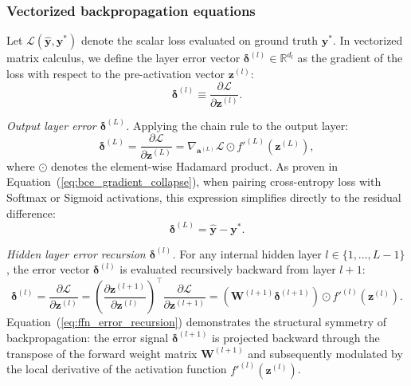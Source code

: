 \documentclass[../../../main.tex]{subfiles}
\begin{document}
\subsubsection{Vectorized backpropagation equations}

Let $\mathcal{L}(\hat{\mathbf{y}}, \mathbf{y}^*)$ denote the scalar loss evaluated on ground truth $\mathbf{y}^*$. In vectorized matrix calculus, we define the layer error vector $\bm{\delta}^{(l)} \in \mathbb{R}^{d_l}$ as the gradient of the loss with respect to the pre-activation vector $\mathbf{z}^{(l)}$:
\begin{equation}
\bm{\delta}^{(l)} \equiv \frac{\partial \mathcal{L}}{\partial \mathbf{z}^{(l)}}.
\end{equation}

\textit{Output layer error $\bm{\delta}^{(L)}$.} Applying the chain rule to the output layer:
\begin{equation}
\bm{\delta}^{(L)} = \frac{\partial \mathcal{L}}{\partial \mathbf{z}^{(L)}} = \nabla_{\mathbf{a}^{(L)}} \mathcal{L} \odot f'^{(L)}\left(\mathbf{z}^{(L)}\right),
\end{equation}
where $\odot$ denotes the element-wise Hadamard product. As proven in Equation~(\ref{eq:bce_gradient_collapse}), when pairing cross-entropy loss with Softmax or Sigmoid activations, this expression simplifies directly to the residual difference:
\begin{equation}
\bm{\delta}^{(L)} = \hat{\mathbf{y}} - \mathbf{y}^*.
\end{equation}

\textit{Hidden layer error recursion $\bm{\delta}^{(l)}$.} For any internal hidden layer $l \in \{1, \dots, L-1\}$, the error vector $\bm{\delta}^{(l)}$ is evaluated recursively backward from layer $l+1$:
\begin{equation}
\bm{\delta}^{(l)} = \frac{\partial \mathcal{L}}{\partial \mathbf{z}^{(l)}} = \left( \frac{\partial \mathbf{z}^{(l+1)}}{\partial \mathbf{z}^{(l)}} \right)^\top \frac{\partial \mathcal{L}}{\partial \mathbf{z}^{(l+1)}} = \left( \mathbf{W}^{(l+1)} \bm{\delta}^{(l+1)} \right) \odot f'^{(l)}\left(\mathbf{z}^{(l)}\right).
\label{eq:ffn_error_recursion}
\end{equation}
Equation~(\ref{eq:ffn_error_recursion}) demonstrates the structural symmetry of backpropagation: the error signal $\bm{\delta}^{(l+1)}$ is projected backward through the transpose of the forward weight matrix $\mathbf{W}^{(l+1)}$ and subsequently modulated by the local derivative of the activation function $f'^{(l)}(\mathbf{z}^{(l)})$.
\end{document}
